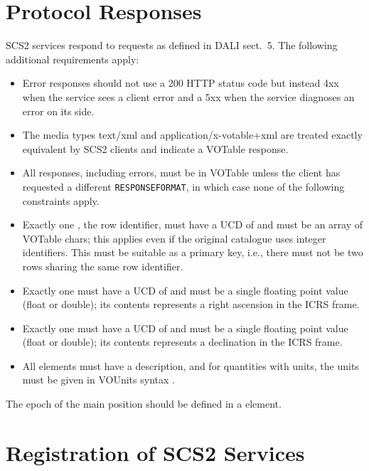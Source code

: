 \documentclass[11pt,a4paper]{ivoa}
\begin{document}
\section{Protocol Responses}

SCS2 services respond to requests as defined in DALI sect.~5.  The
following additional requirements apply:

\begin{itemize}
\item Error responses should not use a 200 HTTP status code but instead
4xx when the service sees a client error and a 5xx when the service
diagnoses an error on its side.

\item The media types text/xml and application/x-votable+xml are treated
exactly equivalent by SCS2 clients and indicate a VOTable response.

\item All responses, including errors, must be in VOTable unless the
client has requested a different \verb|RESPONSEFORMAT|, in which case none of
the following constraints apply.

\item Exactly one , the row identifier, must have a UCD of
 and must be an array of VOTable chars; this
applies even if the original catalogue uses integer identifiers.  This
must be suitable as a primary key, i.e., there must not be two rows
sharing the same row identifier.

\item Exactly one  must have a UCD of
 and must be a single floating point value
(float or double); its contents represents a right ascension in the ICRS
frame.

\item Exactly one  must have a UCD of
 and must be a single floating point value
(float or double); its contents represents a declination in the ICRS
frame.

\item All  elements must have a description, and for
quantities with units, the units must be given in VOUnits syntax
\citep{2014ivoa.spec.0523D}.

\end{itemize}

The epoch of the main position should be defined in a  element.


\section{Registration of SCS2 Services}
\end{document}
